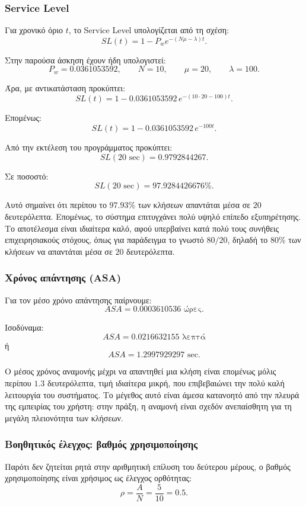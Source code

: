 \documentclass{article}
\begin{document}
\subsubsection{Service Level}

Για χρονικό όριο $t$, το \foreignlanguage{english}{Service Level} υπολογίζεται από τη σχέση:
\[
SL(t) = 1 - P_w e^{-(N\mu-\lambda)t}.
\]

Στην παρούσα άσκηση έχουν ήδη υπολογιστεί:
\[
P_w = 0.0361053592,\qquad N = 10,\qquad \mu = 20,\qquad \lambda = 100.
\]

Άρα, με αντικατάσταση προκύπτει:
\[
SL(t) = 1 - 0.0361053592 \, e^{-(10\cdot 20 - 100)t}.
\]

Επομένως:
\[
SL(t) = 1 - 0.0361053592 \, e^{-100t}.
\]

Από την εκτέλεση του προγράμματος προκύπτει:
\[
\boxed{SL(20\text{ sec}) = 0.9792844267}.
\]

Σε ποσοστό:
\[
\boxed{SL(20\text{ sec}) = 97.9284426676\%}.
\]

Αυτό σημαίνει ότι περίπου το $97.93\%$ των κλήσεων απαντάται μέσα σε $20$ δευτερόλεπτα. Επομένως, το σύστημα επιτυγχάνει πολύ υψηλό επίπεδο εξυπηρέτησης. Το αποτέλεσμα είναι ιδιαίτερα καλό, αφού υπερβαίνει κατά πολύ τους συνήθεις επιχειρησιακούς στόχους, όπως για παράδειγμα το γνωστό $80/20$, δηλαδή το $80\%$ των κλήσεων να απαντάται μέσα σε $20$ δευτερόλεπτα.

\subsubsection{Χρόνος απάντησης (ASA)}

Για τον μέσο χρόνο απάντησης παίρνουμε:
\[
\boxed{ASA = 0.0003610536 \text{ ώρες}}.
\]

Ισοδύναμα:
\[
ASA = 0.0216632155 \text{ λεπτά}
\]
ή
\[
\boxed{ASA = 1.2997929297 \text{ sec}}.
\]

Ο μέσος χρόνος αναμονής μέχρι να απαντηθεί μια κλήση είναι επομένως μόλις περίπου $1.3$ δευτερόλεπτα, τιμή ιδιαίτερα μικρή, που επιβεβαιώνει την πολύ καλή λειτουργία του συστήματος. Το μέγεθος αυτό είναι άμεσα κατανοητό από την πλευρά της εμπειρίας του χρήστη: στην πράξη, η αναμονή είναι σχεδόν ανεπαίσθητη για τη μεγάλη πλειονότητα των κλήσεων.

\subsubsection{Βοηθητικός έλεγχος: βαθμός χρησιμοποίησης}

Παρότι δεν ζητείται ρητά στην αριθμητική επίλυση του δεύτερου μέρους, ο βαθμός χρησιμοποίησης είναι χρήσιμος ως έλεγχος ορθότητας:
\[
\rho = \frac{A}{N} = \frac{5}{10} = 0.5.
\]
\end{document}
